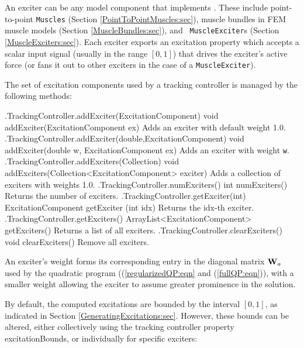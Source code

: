 An exciter can be any model component that implements
. These include
point-to-point {\tt Muscles} (Section \ref{PointToPointMuscles:sec}), muscle
bundles in FEM muscle models (Section \ref{MuscleBundles:sec}), and {\tt
MuscleExciter}s (Section \ref{MuscleExciters:sec}). Each exciter exports an
{\sf excitation} property which accepts a scalar input signal (usually in the
range $[0,1]$) that drives the exciter's active force (or fans it out to other
exciters in the case of a {\tt MuscleExciter}).

The set of excitation components used by a tracking controller is managed by
the following methods:

%
\begin{methodtable}{0.58}{0.42}
\midline
%
\methodentry
{\inverse.TrackingController.addExciter(ExcitationComponent)}%
{void addExciter(ExcitationComponent ex)}%
{Adds an exciter with default weight 1.0.}%
%
\methodentry
{\inverse.TrackingController.addExciter(double,ExcitationComponent)}%
{void addExciter(double w, ExcitationComponent ex)}%
{Adds an exciter with weight {\tt w}.}%
%
\methodentry
{\inverse.TrackingController.addExciters(Collection)}%
{void addExciters(Collection<ExcitationComponent> exciter)}%
{Adds a collection of exciters with weights 1.0.}%
%
\methodentry
{\inverse.TrackingController.numExciters()}%
{int numExciters()}%
{Returns the number of exciters.}%
%
\methodentry
{\inverse.TrackingController.getExciter(int)}%
{ExcitationComponent getExciter (int idx)}%
{Returns the idx-th exciter.}%
%
\methodentry
{\inverse.TrackingController.getExciters()}%
{ArrayList<ExcitationComponent> getExciters()}%
{Returns a list of all exciters.}%
%
\methodentry
{\inverse.TrackingController.clearExciters()}%
{void clearExciters()}%
{Remove all exciters.}%
%
\midline
\end{methodtable}
%

An exciter's weight forms its corresponding entry in the diagonal matrix ${\bf W}_a$
used by the quadratic program ((\ref{regularizedQP:eqn} and
(\ref{fullQP:eqn})), with a smaller weight allowing the exciter to assume
greater prominence in the solution.

By default, the computed excitations are bounded by the interval $[0,1]$, as
indicated in Section \ref{GeneratingExcitations:sec}. However, these bounds can
be altered, either collectively using the tracking controller property {\sf
excitationBounds}, or individually for specific exciters:

